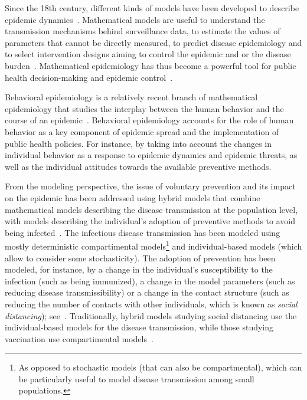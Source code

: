 Since the 18th century, different kinds of models have been developed to describe epidemic dynamics~\cite[]{Brauer2017}. 
Mathematical models are useful to understand the transmission mechanisms behind surveillance data, to estimate the values of parameters that cannot be directly measured, to predict disease epidemiology and to select intervention designs aiming to control the epidemic and or the disease burden~\cite[]{Valleron2000}. Mathematical epidemiology has thus become a powerful tool for public health decision-making and epidemic control~\cite[]{Valleron2000}. 

Behavioral epidemiology is a relatively recent branch of mathematical epidemiology that studies the interplay between the human behavior and the course of an epidemic~\cite[]{Manfredi2013,Verelst2016,Wang2016}. Behavioral epidemiology accounts for the role of human behavior as a key component of epidemic spread and the implementation of public health policies. For instance, by taking into account the changes in individual behavior as a response to epidemic dynamics and epidemic threats, as well as the individual attitudes towards the available preventive methods.

From the modeling perspective, the issue of voluntary prevention and its impact on the epidemic has been addressed using hybrid models that combine mathematical models describing the disease transmission at the population level, with models describing the individual's adoption of preventive methods to avoid being infected~\cite[]{Verelst2016}. The infectious disease transmission has been modeled using mostly deterministic compartimental models\footnote{As opposed to stochastic models (that can also be compartmental), which can be particularly useful to model disease transmission among small populations.}  and individual-based models (which allow to consider some stochasticity). The adoption of prevention has been modeled, for instance, by a change in the individual's susceptibility to the infection (such as being immunized), a change in the model parameters (such as reducing disease transmissibility) or a change in the contact structure (such as reducing the number of contacts with other individuals, which is known as \textit{social distancing}); see~\cite[]{Verelst2016}. Traditionally, hybrid models studying social distancing use the individual-based models for the disease transmission, while those studying vaccination use compartimental models~\cite[]{Verelst2016}.

